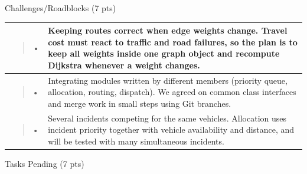 \documentclass[
]{article}
\newcounter{none} %
\begin{document}
Challenges/Roadblocks (7 pts)

{\def\LTcaptype{none} %
\begin{longtable}[]{@{}
  >{\raggedright\arraybackslash}p{}
  >{\raggedright\arraybackslash}p{}@{}}
\toprule\noalign{}
\begin{minipage}[b]{\linewidth}\raggedright
\begin{quote}
•
\end{quote}
\end{minipage} & \begin{minipage}[b]{\linewidth}\raggedright
Keeping routes correct when edge weights change. Travel cost must react
to traffic and road failures, so the plan is to keep all weights inside
one graph object and recompute Dijkstra whenever a weight changes.
\end{minipage} \\
\midrule\noalign{}
\endhead
\bottomrule\noalign{}
\endlastfoot
\begin{minipage}[t]{\linewidth}\raggedright
\begin{quote}
•
\end{quote}
\end{minipage} & Integrating modules written by different members
(priority queue, allocation, routing, dispatch). We agreed on common
class interfaces and merge work in small steps using Git branches. \\
\begin{minipage}[t]{\linewidth}\raggedright
\begin{quote}
•
\end{quote}
\end{minipage} & Several incidents competing for the same vehicles.
Allocation uses incident priority together with vehicle availability and
distance, and will be tested with many simultaneous incidents. \\
\end{longtable}
}

Tasks Pending (7 pts)
\end{document}

